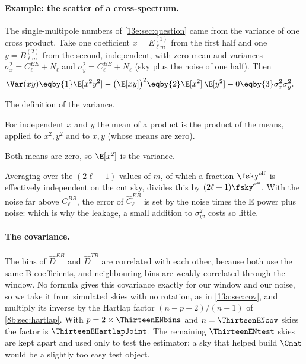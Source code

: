 \paragraph{Example: the scatter of a cross-spectrum.} The single-multipole numbers of
\cref{13e:sec:question} came from the variance of one cross product. Take one coefficient $x=E^{(1)}_{\ell m}$
from the first half and one $y=B^{(2)}_{\ell m}$ from the second, independent, with zero mean and variances
$\sigma_x^2=C^{EE}_\ell+N_\ell$ and $\sigma_y^2=C^{BB}_\ell+N_\ell$ (sky plus the noise of one half). Then
\begin{align}
  \Var(xy)
  &\eqby{1}\E[x^2y^2]-\bigl(\E[xy]\bigr)^2
   \eqby{2}\E[x^2]\,\E[y^2]-0
   \eqby{3}\sigma_x^2\sigma_y^2 .
\end{align}
\begin{explain}
  \item The definition of the variance.
  \item For independent $x$ and $y$ the mean of a product is the product of the means, applied to $x^2,y^2$
        and to $x,y$ (whose means are zero).
  \item Both means are zero, so $\E[x^2]$ is the variance.
\end{explain}
Averaging over the $(2\ell+1)$ values of $m$, of which a fraction $\fsky^{\rm eff}$ is effectively independent
on the cut sky, divides this by $(2\ell+1)\fsky^{\rm eff}$. With the noise far above $C^{BB}_\ell$, the error of
$\widehat C^{EB}_\ell$ is set by the noise times the E power plus noise: which is why the leakage, a small addition to
$\sigma_y^2$, costs so little.

\paragraph{The covariance.} The bins of $\widehat D^{EB}$ and $\widehat D^{TB}$ are correlated with each other,
because both use the same B coefficients, and neighbouring bins are weakly correlated through the window.
No formula gives this covariance exactly for our window and our noise, so we take it from simulated skies with
no rotation, as in \cref{13a:sec:cov}, and multiply its inverse by the Hartlap factor
$(n-p-2)/(n-1)$ of \cref{8b:sec:hartlap}. With $p=2\times\ThirteenENbins$ and $n=\ThirteenENcov$ skies the
factor is $\ThirteenEHartlapJoint$. The remaining $\ThirteenENtest$ skies are kept apart and used only to test
the estimator: a sky that helped build $\Cmat$ would be a slightly too easy test object.

